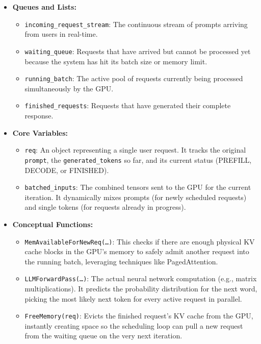 \documentclass[11pt]{article}
\begin{document}
\begin{itemize}
    \item \textbf{Queues and Lists:}
    \begin{itemize}
        \item \texttt{incoming\_request\_stream}: The continuous stream of prompts arriving from users in real-time.
        \item \texttt{waiting\_queue}: Requests that have arrived but cannot be processed yet because the system has hit its batch size or memory limit.
        \item \texttt{running\_batch}: The active pool of requests currently being processed simultaneously by the GPU.
        \item \texttt{finished\_requests}: Requests that have generated their complete response.
    \end{itemize}
    \item \textbf{Core Variables:}
    \begin{itemize}
        \item \texttt{req}: An object representing a single user request. It tracks the original \texttt{prompt}, the \texttt{generated\_tokens} so far, and its current status (PREFILL, DECODE, or FINISHED).
        \item \texttt{batched\_inputs}: The combined tensors sent to the GPU for the current iteration. It dynamically mixes prompts (for newly scheduled requests) and single tokens (for requests already in progress).
    \end{itemize}
    \item \textbf{Conceptual Functions:}
    \begin{itemize}
        \item \texttt{MemAvailableForNewReq(\dots)}: This checks if there are enough physical KV cache blocks in the GPU's memory to safely admit another request into the running batch, leveraging techniques like PagedAttention.
        \item \texttt{LLMForwardPass(\dots)}: The actual neural network computation (e.g., matrix multiplications). It predicts the probability distribution for the next word, picking the most likely next token for every active request in parallel.
        \item \texttt{FreeMemory(req)}: Evicts the finished request's KV cache from the GPU, instantly creating space so the scheduling loop can pull a new request from the waiting queue on the very next iteration.
    \end{itemize}
\end{itemize}
\end{document}
